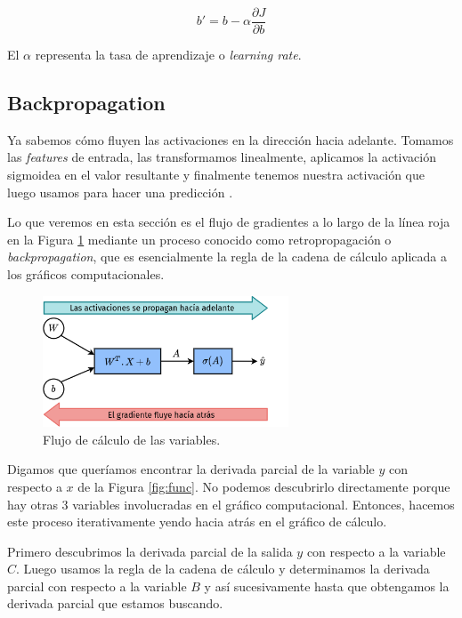 \documentclass[a4paper,12pt]{article}
\begin{document}
\begin{equation}
	b' = b - \alpha \frac{\partial J}{\partial b}
\end{equation}

El $\alpha$ representa la tasa de aprendizaje o  \textit{learning rate}.

\subsection{Backpropagation}

Ya sabemos cómo fluyen las activaciones en la dirección hacia adelante. Tomamos las \textit{features} de entrada, las transformamos linealmente, aplicamos la activación sigmoidea en el valor resultante y finalmente tenemos nuestra activación que luego usamos para hacer una predicción \citep{sgd}.

Lo que veremos en esta sección es el flujo de gradientes a lo largo de la línea roja en la Figura \ref{fig:back} mediante un proceso conocido como retropropagación o \textit{backpropagation}, que es esencialmente la regla de la cadena de cálculo aplicada a los gráficos computacionales.

\begin{figure}[H]
	\begin{center}				
		\includegraphics[width=0.65\textwidth]{024.png}
		\caption{Flujo de cálculo de las variables.}
		\label{fig:back}
	\end{center}
\end{figure}

Digamos que queríamos encontrar la derivada parcial de la variable $y$ con respecto a $x$ de la Figura \ref{fig:func}. No podemos descubrirlo directamente porque hay otras 3 variables involucradas en el gráfico computacional. Entonces, hacemos este proceso iterativamente yendo hacia atrás en el gráfico de cálculo.

Primero descubrimos la derivada parcial de la salida $y$ con respecto a la variable $C$. Luego usamos la regla de la cadena de cálculo y determinamos la derivada parcial con respecto a la variable $B$ y así sucesivamente hasta que obtengamos la derivada parcial que estamos buscando.
\end{document}
